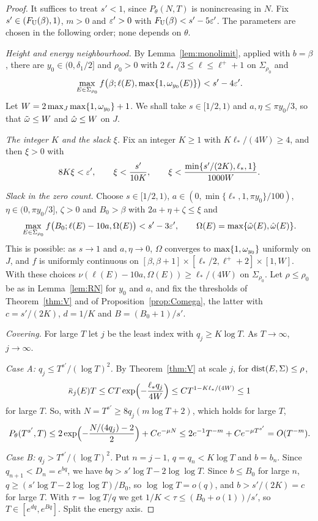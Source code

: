 \begin{proof}
It suffices to treat $s'<1$, since $P_\theta(N,T)$ is nonincreasing in $N$. Fix $s'\in(F_{\mathrm U}(\beta),1)$, $m>0$ and $\varepsilon'>0$ with $F_{\mathrm U}(\beta)<s'-5\varepsilon'$. The parameters are chosen in the following order; none depends on $\theta$.

\emph{Height and energy neighbourhood.} By Lemma~\ref{lem:monolimit}, applied with $b=\beta$, there are $y_0\in(0,\delta_1/2]$ and $\rho_0>0$ with $2\ell_*/3\le\ell\le\ell^++1$ on $\Sigma_{\rho_0}$ and
\[
\max_{E\in\Sigma_{\rho_0}}f\bigl(\beta;\ell(E),\max\{1,\omega_{y_0}(E)\}\bigr)<s'-4\varepsilon'.
\]
Let $W=2\max_J\max\{1,\omega_{y_0}\}+1$. We shall take $s\in[1/2,1)$ and $a,\eta\le\pi y_0/3$, so that $\tilde\omega\le W$ and $\hat\omega\le W$ on $J$.

\emph{The integer $K$ and the slack $\xi$.} Fix an integer $K\ge1$ with $K\ell_*/(4W)\ge4$, and then $\xi>0$ with
\[
8K\xi<\varepsilon',\qquad\xi<\frac{s'}{10K},\qquad\xi<\frac{\min\{s'/(2K),\ell_*,1\}}{1000W}.
\]

\emph{Slack in the zero count.} Choose $s\in[1/2,1)$, $a\in(0,\min\{\ell_*,1,\pi y_0\}/100)$, $\eta\in(0,\pi y_0/3]$, $\zeta>0$ and $B_0>\beta$ with $2a+\eta+\zeta\le\xi$ and
\[
\max_{E\in\Sigma_{\rho_0}}f\bigl(B_0;\ell(E)-10a,\Omega(E)\bigr)<s'-3\varepsilon',\qquad\Omega(E)=\max\{\tilde\omega(E),\hat\omega(E)\}.
\]
This is possible: as $s\to1$ and $a,\eta\to0$, $\Omega$ converges to $\max\{1,\omega_{y_0}\}$ uniformly on $J$, and $f$ is uniformly continuous on $[\beta,\beta+1]\times[\ell_*/2,\ell^++2]\times[1,W]$. With these choices $\nu(\ell(E)-10a,\Omega(E))\ge\ell_*/(4W)$ on $\Sigma_{\rho_0}$. Let $\rho\le\rho_0$ be as in Lemma~\ref{lem:RN} for $y_0$ and $a$, and fix the thresholds of Theorem~\ref{thm:V} and of Proposition~\ref{prop:Comega}, the latter with $c=s'/(2K)$, $d=1/K$ and $B=(B_0+1)/s'$.

\emph{Covering.} For large $T$ let $j$ be the least index with $q_j\ge K\log T$. As $T\to\infty$, $j\to\infty$.

\emph{Case A: $q_j\le T^{s'}/(\log T)^2$.} By Theorem~\ref{thm:V} at scale $j$, for $\operatorname{dist}(E,\Sigma)\le\rho$,
\[
\bar\kappa_j(E)T\le CT\exp\Bigl(-\frac{\ell_*q_j}{4W}\Bigr)\le CT^{1-K\ell_*/(4W)}\le1
\]
for large $T$. So, with $N=T^{s'}\ge8q_j(m\log T+2)$, which holds for large $T$,
\[
P_\theta(T^{s'},T)\le2\exp\Bigl(-\frac{N/(4q_j)-2}{2}\Bigr)+Ce^{-\mu N}\le2e^{-1}T^{-m}+Ce^{-\mu T^{s'}}=O(T^{-m}).
\]

\emph{Case B: $q_j>T^{s'}/(\log T)^2$.} Put $n=j-1$, $q=q_n<K\log T$ and $b=b_n$. Since $q_{n+1}<D_n=e^{bq}$, we have $bq>s'\log T-2\log\log T$. Since $b\le B_0$ for large $n$, $q\ge(s'\log T-2\log\log T)/B_0$, so $\log\log T=o(q)$, and $b>s'/(2K)=c$ for large $T$. With $\tau=\log T/q$ we get $1/K<\tau\le(B_0+o(1))/s'$, so $T\in[e^{dq},e^{Bq}]$. Split the energy axis.


\end{proof}
